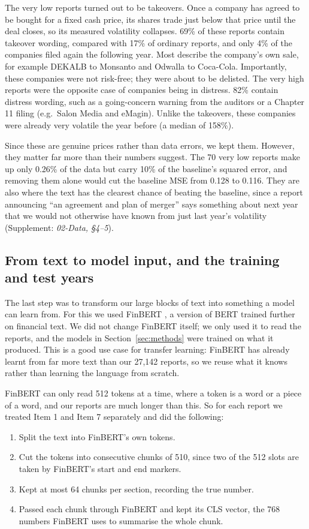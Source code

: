 \documentclass[11pt,a4paper]{article}
\newcommand{\supp}[1]{(Supplement: \textit{#1})}
\begin{document}
The very low reports turned out to be takeovers. Once a company has agreed to be bought for a fixed cash price, its shares trade just below that price until the deal closes, so its measured volatility collapses. 69\% of these reports contain takeover wording, compared with 17\% of ordinary reports, and only 4\% of the companies filed again the following year. Most describe the company's own sale, for example DEKALB to Monsanto and Odwalla to Coca-Cola. Importantly, these companies were not risk-free; they were about to be delisted. The very high reports were the opposite case of companies being in distress. 82\% contain distress wording, such as a going-concern warning from the auditors or a Chapter 11 filing (e.g.\ Salon Media and eMagin). Unlike the takeovers, these companies were already very volatile the year before (a median of 158\%).

Since these are genuine prices rather than data errors, we kept them. However, they matter far more than their numbers suggest. The 70 very low reports make up only 0.26\% of the data but carry 10\% of the baseline's squared error, and removing them alone would cut the baseline MSE from 0.128 to 0.116. They are also where the text has the clearest chance of beating the baseline, since a report announcing ``an agreement and plan of merger'' says something about next year that we would not otherwise have known from just last year's volatility \supp{02-Data, \S4--5}.

\subsection{From text to model input, and the training and test years}\label{sec:data-input}
The last step was to transform our large blocks of text into something a model can learn from. For this we used FinBERT \citep{araci2019}, a version of BERT \citep{devlin2019} trained further on financial text. We did not change FinBERT itself; we only used it to read the reports, and the models in Section~\ref{sec:methods} were trained on what it produced. This is a good use case for transfer learning: FinBERT has already learnt from far more text than our 27,142 reports, so we reuse what it knows rather than learning the language from scratch.

FinBERT can only read 512 tokens at a time, where a token is a word or a piece of a word, and our reports are much longer than this. So for each report we treated Item 1 and Item 7 separately and did the following:
\begin{enumerate}
  \item Split the text into FinBERT's own tokens.
  \item Cut the tokens into consecutive chunks of 510, since two of the 512 slots are taken by FinBERT's start and end markers.
  \item Kept at most 64 chunks per section, recording the true number.
  \item Passed each chunk through FinBERT and kept its CLS vector, the 768 numbers FinBERT uses to summarise the whole chunk.
\end{enumerate}
\end{document}
